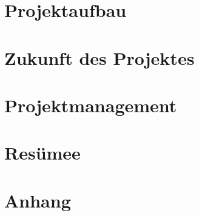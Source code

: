 \documentclass[12pt]{report}
\begin{document}
    \chapter{Projektaufbau}
        

    \chapter{Zukunft des Projektes}
        

    \chapter{Projektmanagement}
        

    \chapter{Resümee}
        

    \chapter{Anhang}
        \printbibliography
        
    
\end{document}

